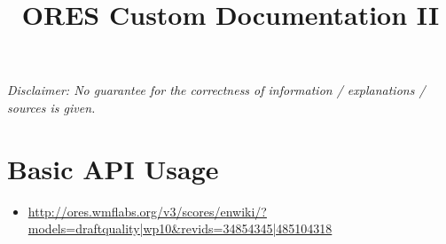 \documentclass[12pt,a4paper]{article}
\title{ORES Custom Documentation II}
\date{}
\begin{document}
\maketitle
\textit{Disclaimer: No guarantee for the correctness of information / explanations / sources is given.}
\section{Basic API Usage}
\begin{itemize}
\item \url{http://ores.wmflabs.org/v3/scores/enwiki/?models=draftquality|wp10&revids=34854345|485104318}
\end{itemize}
\end{document}
